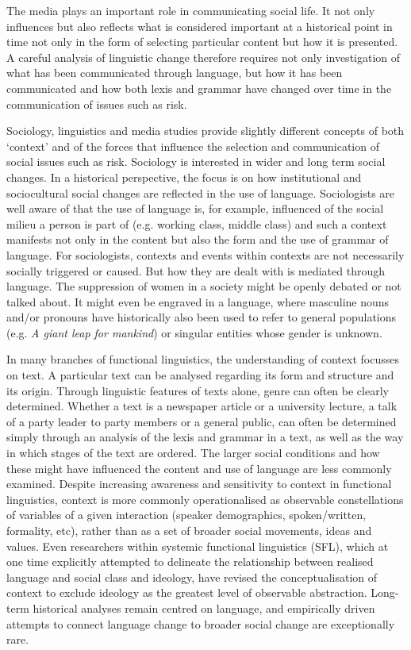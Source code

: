 \documentclass{report}
\begin{document}
The media plays an important role in communicating social life. It not only influences but also reflects what is considered important at a historical point in time not only in the form of selecting particular content but how it is presented. A careful analysis of linguistic change therefore requires not only investigation of what has been communicated through language, but how it has been communicated and how both lexis and grammar have changed over time in the communication of issues such as risk.

Sociology, linguistics and media studies provide slightly different concepts of both `context' and of the forces that influence the selection and communication of social issues such as risk. Sociology is interested in wider and long term social changes. In a historical perspective, the focus is on how institutional and sociocultural social changes are reflected in the use of language. Sociologists are well aware of that the use of language is, for example, influenced of the social milieu a person is part of (e.g. working class, middle class) and such a context manifests not only in the content but also the form and the use of grammar of language. For sociologists, contexts and events within contexts are not necessarily socially triggered or caused. But how they are dealt with is mediated through language. The suppression of women in a society might be openly debated or not talked about. It might even be engraved in a language, where masculine nouns and\slash or pronouns have historically also been used to refer to general populations (e.g. \emph{A giant leap for mankind}) or singular entities whose gender is unknown.


In many branches of functional linguistics, the understanding of context focusses on text. A particular text can be analysed regarding its form and structure and its origin. Through linguistic features of texts alone, genre can often be clearly determined. Whether a text is a newspaper article or a university lecture, a talk of a party leader to party members or a general public, can often be determined simply through an analysis of the lexis and grammar in a text, as well as the way in which stages of the text are ordered. The larger social conditions and how these might have influenced the content and use of language are less commonly examined. Despite increasing awareness and sensitivity to context in functional linguistics, context is more commonly operationalised as observable constellations of variables of a given interaction (speaker demographics, spoken\slash written, formality, etc), rather than as a set of broader social movements, ideas and values. Even researchers within systemic functional linguistics (SFL), which at one time explicitly attempted to delineate the relationship between realised language and social class and ideology, have revised the conceptualisation of context to exclude ideology as the greatest level of observable abstraction. Long-term historical analyses remain centred on language, and empirically driven attempts to connect language change to broader social change are exceptionally rare.
\end{document}

